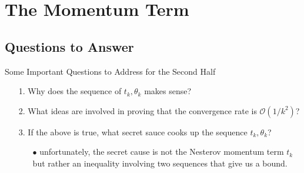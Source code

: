 \documentclass[11pt]{beamer}
\begin{document}
\section{The Momentum Term}
    \subsection{Questions to Answer}
        \begin{frame}{Some Important Questions to Address for the Second Half}
            \begin{itemize}
                \item [1.] Why does the sequence of $t_k, \theta_k$ makes sense?
                \item [2.] What ideas are involved in proving that the convergence rate is $\mathcal O(1/k^2)$? 
                \item [3.] If the above is true, what secret sauce cooks up the sequence $t_k, \theta_k$?
                \begin{itemize}
                    \item [$\bullet$] unfortunately, the secret cause is not the Nesterov momentum term $t_k$ but rather an inequality involving two sequences that give us a bound. 
                \end{itemize}
            \end{itemize}
        \end{frame}
\end{document}
